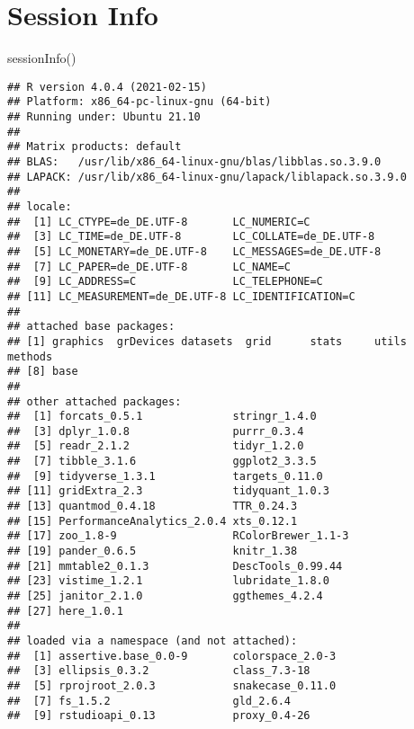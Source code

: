\documentclass[
]{article}
\newenvironment{Shaded}{\begin{snugshade}}{\end{snugshade}}
\newcommand{\FunctionTok}[1]{\textcolor[rgb]{0.00,0.00,0.00}{#1}}
\newcommand{\NormalTok}[1]{#1}
\begin{document}
\hypertarget{session-info}{%
\section{Session Info}\label{session-info}}

\begin{Shaded}
\begin{Highlighting}[]
\FunctionTok{sessionInfo}\NormalTok{()}
\end{Highlighting}
\end{Shaded}

\begin{verbatim}
## R version 4.0.4 (2021-02-15)
## Platform: x86_64-pc-linux-gnu (64-bit)
## Running under: Ubuntu 21.10
## 
## Matrix products: default
## BLAS:   /usr/lib/x86_64-linux-gnu/blas/libblas.so.3.9.0
## LAPACK: /usr/lib/x86_64-linux-gnu/lapack/liblapack.so.3.9.0
## 
## locale:
##  [1] LC_CTYPE=de_DE.UTF-8       LC_NUMERIC=C              
##  [3] LC_TIME=de_DE.UTF-8        LC_COLLATE=de_DE.UTF-8    
##  [5] LC_MONETARY=de_DE.UTF-8    LC_MESSAGES=de_DE.UTF-8   
##  [7] LC_PAPER=de_DE.UTF-8       LC_NAME=C                 
##  [9] LC_ADDRESS=C               LC_TELEPHONE=C            
## [11] LC_MEASUREMENT=de_DE.UTF-8 LC_IDENTIFICATION=C       
## 
## attached base packages:
## [1] graphics  grDevices datasets  grid      stats     utils     methods  
## [8] base     
## 
## other attached packages:
##  [1] forcats_0.5.1              stringr_1.4.0             
##  [3] dplyr_1.0.8                purrr_0.3.4               
##  [5] readr_2.1.2                tidyr_1.2.0               
##  [7] tibble_3.1.6               ggplot2_3.3.5             
##  [9] tidyverse_1.3.1            targets_0.11.0            
## [11] gridExtra_2.3              tidyquant_1.0.3           
## [13] quantmod_0.4.18            TTR_0.24.3                
## [15] PerformanceAnalytics_2.0.4 xts_0.12.1                
## [17] zoo_1.8-9                  RColorBrewer_1.1-3        
## [19] pander_0.6.5               knitr_1.38                
## [21] mmtable2_0.1.3             DescTools_0.99.44         
## [23] vistime_1.2.1              lubridate_1.8.0           
## [25] janitor_2.1.0              ggthemes_4.2.4            
## [27] here_1.0.1                
## 
## loaded via a namespace (and not attached):
##  [1] assertive.base_0.0-9       colorspace_2.0-3          
##  [3] ellipsis_0.3.2             class_7.3-18              
##  [5] rprojroot_2.0.3            snakecase_0.11.0          
##  [7] fs_1.5.2                   gld_2.6.4                 
##  [9] rstudioapi_0.13            proxy_0.4-26              

\end{verbatim}
\end{document}
